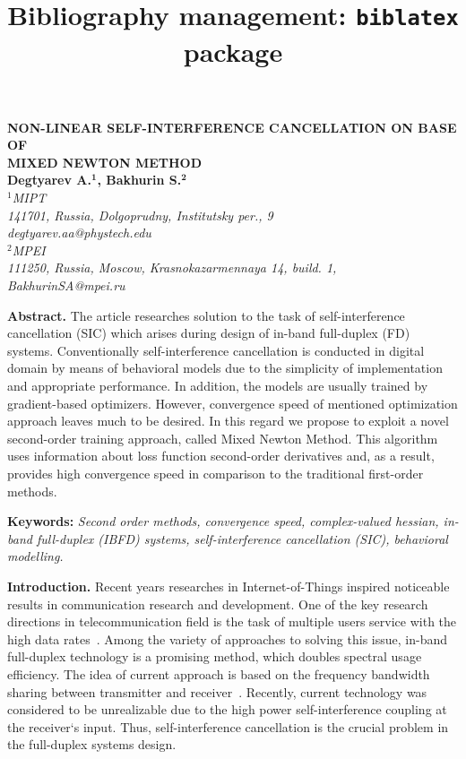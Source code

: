 \documentclass[12pt]{article}
\title{Bibliography management: \texttt{biblatex} package}
\begin{document}
\begin{center}	
\textbf{NON-LINEAR SELF-INTERFERENCE CANCELLATION ON BASE OF \\ MIXED NEWTON METHOD
	\\[1em]
Degtyarev A.$^{\mathbf{1}}$, Bakhurin S.$^{\mathbf{2}}$
}
\\[1em]
\textit{$^{\mathit{1}}$MIPT\\
141701, Russia, Dolgoprudny, Institutsky per., 9\\
degtyarev.aa@phystech.edu
\\[1em]
$^{\mathit{2}}$MPEI\\
111250, Russia,  Moscow, Krasnokazarmennaya 14, build. 1,\\
BakhurinSA@mpei.ru
}
\end{center}


\textbf{Abstract.} 
The article researches solution to the task of self-interference cancellation (SIC) which arises during design of in-band full-duplex (FD) systems. Conventionally self-interference cancellation is conducted in digital domain by means of behavioral models due to the simplicity of implementation and appropriate performance. In addition, the models are usually trained by gradient-based optimizers. However, convergence speed of mentioned optimization approach leaves much to be desired. In this regard we propose to exploit a novel second-order training approach, called Mixed Newton Method. This algorithm uses information about loss function second-order derivatives and, as a result, provides high convergence speed in comparison to the traditional first-order methods.

\textbf{Keywords:} \textit{Second order methods, convergence speed, complex-valued hessian, in-band full-duplex (IBFD) systems, self-interference cancellation (SIC), behavioral modelling.}


\textbf{Introduction.}
Recent years researches in Internet-of-Things inspired noticeable results in communication research and development. One of the key research directions in telecommunication field is the task of multiple users service with the high data rates~\cite{6g_trends}. Among the variety of approaches to solving this issue, in-band full-duplex technology is a promising method, which doubles spectral usage efficiency. The idea of current approach is based on the frequency bandwidth sharing between transmitter and receiver~\cite{analog_sic_1, fd_transceiver, analog_sic_2}. Recently, current technology was considered to be unrealizable due to the high power self-interference coupling at the receiver`s input. Thus, self-interference cancellation is the crucial problem in the full-duplex systems design.
\end{document}
